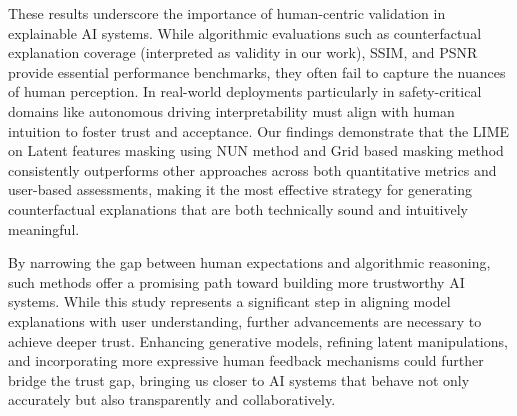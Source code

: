 These results underscore the importance of human-centric validation in explainable AI systems. While algorithmic evaluations such as counterfactual explanation coverage (interpreted as validity in our work), SSIM, and PSNR provide essential performance benchmarks, they often fail to capture the nuances of human perception. In real-world deployments particularly in safety-critical domains like autonomous driving interpretability must align with human intuition to foster trust and acceptance. Our findings demonstrate that the LIME on Latent features masking using NUN method and Grid based masking method consistently outperforms other approaches across both quantitative metrics and user-based assessments, making it the most effective strategy for generating counterfactual explanations that are both technically sound and intuitively meaningful.

By narrowing the gap between human expectations and algorithmic reasoning, such methods offer a promising path toward building more trustworthy AI systems. While this study represents a significant step in aligning model explanations with user understanding, further advancements are necessary to achieve deeper trust. Enhancing generative models, refining latent manipulations, and incorporating more expressive human feedback mechanisms could further bridge the trust gap, bringing us closer to AI systems that behave not only accurately but also transparently and collaboratively.